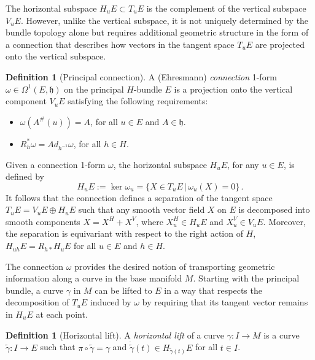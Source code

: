 \documentclass[12pt,a4paper]{article}
\numberwithin{equation}{section}
\theoremstyle{plain}
\theoremstyle{definition}
\newtheorem{definition}[theorem]{Definition}
\theoremstyle{remark}
\begin{document}
The horizontal subspace $H_uE \subset T_uE$ is the complement of the vertical subspace $V_uE$. However, unlike the vertical subspace, it is not uniquely determined by the bundle topology alone but requires additional geometric structure in the form of a connection that describes how vectors in the tangent space $T_uE$ are projected onto the vertical subspace.

\begin{definition}[Principal connection]\label{def:connection_1_form}
    A (Ehresmann) \textit{connection} 1-form $\omega\in\Omega^1(E,\mathfrak{h})$ on the principal $H$-bundle $E$ is a projection onto the vertical component $V_uE$ satisfying the following requirements:
    \begin{itemize}
        \item[(i)] $\omega(A^\#(u))=A$, for all $u\in E$ and $A\in\mathfrak{h}$. 
        \item[(ii)] $R_h^*\omega=Ad_{h^{-1}}\omega$, for all $h\in H$.
    \end{itemize}
\end{definition}

Given a connection 1-form $\omega$, the horizontal subspace $H_uE$, for any $u\in E$, is defined by
\begin{equation}
    H_uE:= \ker \omega_u = \{X\in T_uE\,|\,\omega_u(X)=0\}\,.
\end{equation}
It follows that the connection defines a separation of the tangent space $T_uE=V_uE\oplus H_uE$ such that any smooth vector field $X$ on $E$ is decomposed into smooth components $X=X^H+X^V$, where $X^H_u\in H_uE$ and $X^V_u\in V_uE$. Moreover, the separation is equivariant with respect to the right action of $H$, $H_{uh}E = R_{h*}H_uE$ for all $u\in E$ and $h\in H$.

 
The connection $\omega$ provides the desired notion of transporting geometric information along a curve in the base manifold $M$. Starting with the principal bundle, a curve $\gamma$ in $M$ can be lifted to $E$ in a way that respects the decomposition of $T_uE$ induced by $\omega$ by requiring that its tangent vector remains in $H_uE$ at each point.

\begin{definition}[Horizontal lift]\label{dfn:horizontal_lift}
    A \textit{horizontal lift} of a curve $\gamma:I\to M$ is a curve $\tilde{\gamma}:I\to E$ such that $\pi\circ\tilde{\gamma}=\gamma$ and $\dot{\tilde{\gamma}}(t)\in H_{\tilde{\gamma}(t)}E$ for all $t\in I$.
\end{definition}
\end{document}
